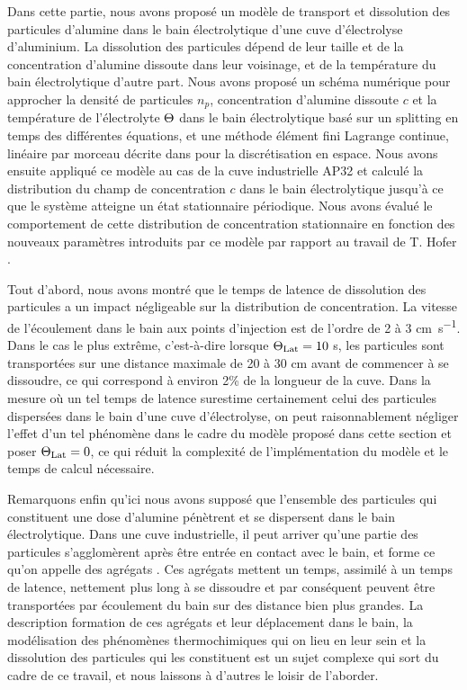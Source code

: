 Dans cette partie, nous avons proposé un modèle de transport et
dissolution des particules d'alumine dans le bain électrolytique d'une
cuve d'électrolyse d'aluminium. La dissolution des particules dépend
de leur taille et de la concentration d'alumine dissoute dans leur
voisinage, et de la température du bain électrolytique d'autre
part. Nous avons proposé un schéma numérique pour approcher la densité
de particules $n_p$, concentration d'alumine dissoute $c$ et la
température de l'électrolyte $\Theta$ dans le bain
électrolytique basé sur un splitting en temps des différentes
équations, et une méthode élément fini Lagrange continue, linéaire par
morceau décrite dans \cite{Hofer2011} pour la discrétisation en
espace. Nous avons ensuite appliqué ce modèle au cas de la cuve
industrielle AP32 et calculé la distribution du champ de concentration
$c$ dans le bain électrolytique jusqu'à ce que le système atteigne un
état stationnaire périodique. Nous avons évalué le comportement de
cette distribution de concentration stationnaire en fonction des
nouveaux paramètres introduits par ce modèle par rapport au travail de
T. Hofer \cite{Hofer2011}.

Tout d'abord, nous avons montré que le temps de latence de dissolution
des particules a un impact négligeable sur la distribution de
concentration. La vitesse de l'écoulement dans le bain aux points
d'injection est de l'ordre de 2 à 3 \si{\centi\meter\per\second}. Dans
le cas le plus extrême, c'est-à-dire lorsque $\Theta_\text{Lat} = 10$
\si{\second}, les particules sont transportées sur une distance
maximale de 20 à 30 \si{\centi\meter} avant de commencer à se
dissoudre, ce qui correspond à environ 2\% de la longueur de la
cuve. Dans la mesure où un tel temps de latence surestime certainement
celui des particules dispersées dans le bain d'une cuve d'électrolyse,
on peut raisonnablement négliger l'effet d'un tel phénomène dans le
cadre du modèle proposé dans cette section et poser $\Theta_\text{Lat} = 0$, ce
qui réduit la complexité de l'implémentation du modèle et le temps de
calcul nécessaire.

Remarquons enfin qu'ici nous avons supposé que l'ensemble des
particules qui constituent une dose d'alumine pénètrent et se
dispersent dans le bain électrolytique. Dans une cuve industrielle, il
peut arriver qu'une partie des particules s'agglomèrent après être
entrée en contact avec le bain, et forme ce qu'on appelle des agrégats
\cite{Dassylva2015}. Ces agrégats mettent un temps, assimilé à un
temps de latence, nettement plus long à se dissoudre et par conséquent
peuvent être transportées par écoulement du bain sur des distance bien
plus grandes. La description formation de ces agrégats et leur
déplacement dans le bain, la modélisation des phénomènes
thermochimiques qui on lieu en leur sein et la dissolution des
particules qui les constituent est un sujet complexe qui sort du cadre
de ce travail, et nous laissons à d'autres le loisir de l'aborder.

